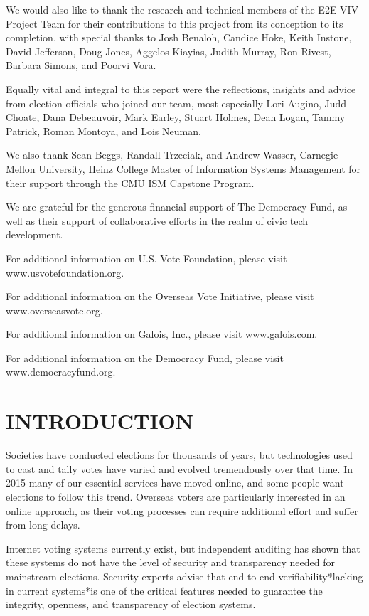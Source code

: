 We would also like to thank the research and technical members of the
E2E-VIV Project Team for their contributions to this project from its 
conception to its completion, with special thanks to Josh Benaloh,
Candice Hoke, Keith Instone, David Jefferson, Doug Jones, Aggelos
Kiayias, Judith Murray, Ron Rivest, Barbara Simons, and Poorvi Vora. 

Equally vital and integral to this report were the reflections,
insights and advice from election officials who joined our team, most
especially Lori Augino, Judd Choate, Dana Debeauvoir, Mark Earley,
Stuart Holmes, Dean Logan, Tammy Patrick, Roman Montoya, and Lois
Neuman.

We also thank Sean Beggs, Randall Trzeciak, and Andrew Wasser,
Carnegie Mellon University, Heinz College Master of Information
Systems Management for their support through the CMU ISM Capstone
Program. 

We are grateful for the generous financial support of The Democracy
Fund, as well as their support of collaborative efforts in the realm
of civic tech development. 

For additional information on U.S. Vote Foundation, please visit
www.usvotefoundation.org.   

For additional information on the Overseas Vote Initiative, please
visit www.overseasvote.org. 

For additional information on Galois, Inc., please visit
www.galois.com.

For additional information on the Democracy Fund, please visit
www.democracyfund.org.  

\newpage

\section*{INTRODUCTION}

Societies have conducted elections for thousands of years, but
technologies used to cast and tally votes have varied and evolved
tremendously over that time. In 2015 many of our essential services
have moved online, and some people want elections to follow this
trend. Overseas voters are particularly interested in an online
approach, as their voting processes can require additional effort and
suffer from long delays.

Internet voting systems currently exist, but independent auditing has
shown that these systems do not have the level of security and
transparency needed for mainstream elections. Security experts advise
that end-to-end verifiability*lacking in current systems*is one of the
critical features needed to guarantee the integrity, openness, and
transparency of election systems.


